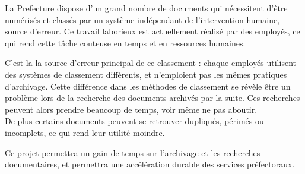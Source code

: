 
La Prefecture dispose d'un grand nombre de documents qui nécessitent d'être numérisés et classés par un système indépendant de l'intervention humaine, source d'erreur.
Ce travail laborieux est actuellement réalisé par des employés, ce qui rend cette tâche couteuse en temps et en ressources humaines.

C'est la la source d'erreur principal de ce classement : chaque employés utilisent des systèmes de classement différents, et n'emploient pas les mêmes pratiques d'archivage.
Cette différence dans les méthodes de classement se révèle être un problème lors de la recherche des documents archivés par la suite.
Ces recherches peuvent alors prendre beaucoup de temps, voir même ne pas aboutir.
\\
De plus certains documents peuvent se retrouver dupliqués, périmés ou incomplets, ce qui rend leur utilité moindre.
\\
\par
Ce projet permettra un gain de temps sur l'archivage et les recherches documentaires, et permettra une accélération durable des services préfectoraux.


